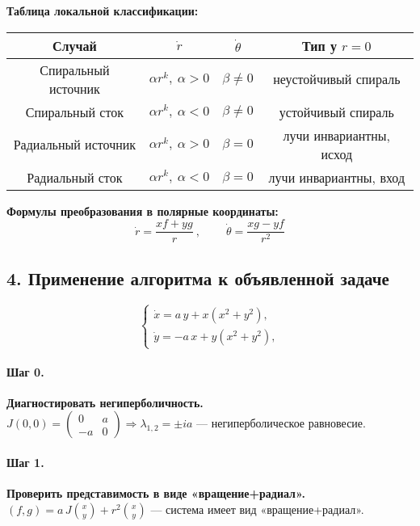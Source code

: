 \textbf{Таблица локальной классификации:}
\begin{center}
\begin{tabular}{|c|c|c|c|}
\hline
\textbf{Случай} & \(\dot r\) & \(\dot\theta\) & \textbf{Тип у } \(r=0\) \\ \hline
Спиральный источник & \(\alpha r^{k},\ \alpha>0\) & \(\beta\ne 0\) & неустойчивый спираль \\ \hline
Спиральный сток & \(\alpha r^{k},\ \alpha<0\) & \(\beta\ne 0\) & устойчивый спираль \\ \hline
Радиальный источник & \(\alpha r^{k},\ \alpha>0\) & \(\beta=0\) & лучи инвариантны, исход \\ \hline
Радиальный сток & \(\alpha r^{k},\ \alpha<0\) & \(\beta=0\) & лучи инвариантны, вход \\ \hline
\end{tabular}
\end{center}

\textbf{Формулы преобразования в полярные координаты:}
\[
\boxed{\ \dot r=\frac{x f+y g}{r}\ },\qquad
\boxed{\ \dot\theta=\frac{x g-y f}{r^{2}}\ }
\]

\subsection*{4. Применение алгоритма к объявленной задаче}

\[
\begin{cases}
\dot{x}=a\,y+x(x^{2}+y^{2}),\\[2pt]
\dot{y}=-a\,x+y(x^{2}+y^{2}),
\end{cases}
\]

\paragraph{Шаг 0.} \textbf{Диагностировать негиперболичность.}\\
\(J(0,0)=\begin{pmatrix}0&a\\ -a&0\end{pmatrix}\Rightarrow \lambda_{1,2}=\pm i a\) — негиперболическое равновесие.

\paragraph{Шаг 1.} \textbf{Проверить представимость в виде «вращение+радиал».}\\
\((f,g)=a\,J\binom{x}{y}+r^{2}\binom{x}{y}\) — система имеет вид «вращение+радиал».

